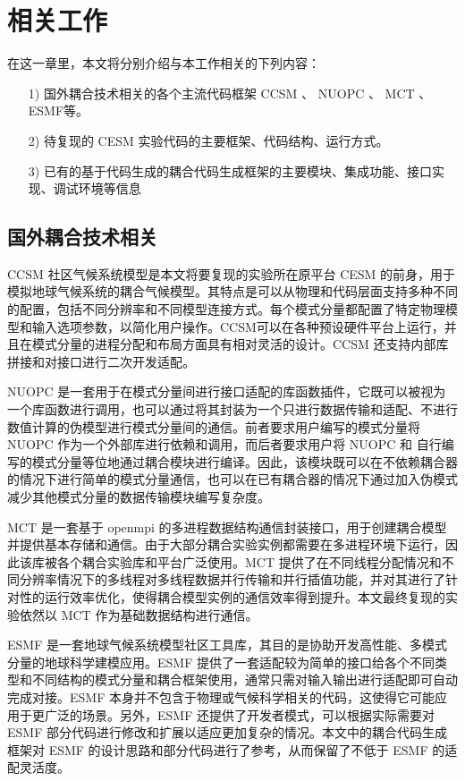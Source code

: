 \chapter{相关工作}
\label{cha:related}

在这一章里，本文将分别介绍与本工作相关的下列内容：
\begin{itemize}
  \item [1)] 
  国外耦合技术相关的各个主流代码框架 CCSM 、 NUOPC 、 MCT 、 ESMF等。
  \item [2)]
  待复现的 CESM 实验代码的主要框架、代码结构、运行方式。
  \item [3)]
  已有的基于代码生成的耦合代码生成框架的主要模块、集成功能、接口实现、调试环境等信息
\end{itemize}

\section{国外耦合技术相关}

CCSM \cite{CCSM} 社区气候系统模型是本文将要复现的实验所在原平台 CESM 的前身，用于模拟地球气候系统的耦合气候模型。其特点是可以从物理和代码层面支持多种不同的配置，包括不同分辨率和不同模型连接方式。每个模式分量都配置了特定物理模型和输入选项参数，以简化用户操作。CCSM可以在各种预设硬件平台上运行，并且在模式分量的进程分配和布局方面具有相对灵活的设计。CCSM 还支持内部库拼接和对接口进行二次开发适配。

NUOPC \cite{NUOPC} 是一套用于在模式分量间进行接口适配的库函数插件，它既可以被视为一个库函数进行调用，也可以通过将其封装为一个只进行数据传输和适配、不进行数值计算的伪模型进行模式分量间的通信。前者要求用户编写的模式分量将 NUOPC 作为一个外部库进行依赖和调用，而后者要求用户将 NUOPC 和 自行编写的模式分量等位地通过耦合模块进行编译。因此，该模块既可以在不依赖耦合器的情况下进行简单的模式分量通信，也可以在已有耦合器的情况下通过加入伪模式减少其他模式分量的数据传输模块编写复杂度。

MCT \cite{OPENMCT1} \cite{OPENMCT2} 是一套基于 openmpi 的多进程数据结构通信封装接口，用于创建耦合模型并提供基本存储和通信。由于大部分耦合实验实例都需要在多进程环境下运行，因此该库被各个耦合实验库和平台广泛使用。MCT 提供了在不同线程分配情况和不同分辨率情况下的多线程对多线程数据并行传输和并行插值功能，并对其进行了针对性的运行效率优化，使得耦合模型实例的通信效率得到提升。本文最终复现的实验依然以 MCT 作为基础数据结构进行通信。

ESMF \cite{ESMF} 是一套地球气候系统模型社区工具库，其目的是协助开发高性能、多模式分量的地球科学建模应用。ESMF 提供了一套适配较为简单的接口给各个不同类型和不同结构的模式分量和耦合框架使用，通常只需对输入输出进行适配即可自动完成对接。ESMF 本身并不包含于物理或气候科学相关的代码，这使得它可能应用于更广泛的场景。另外，ESMF 还提供了开发者模式，可以根据实际需要对 ESMF 部分代码进行修改和扩展以适应更加复杂的情况。本文中的耦合代码生成框架对 ESMF 的设计思路和部分代码进行了参考，从而保留了不低于 ESMF 的适配灵活度。

